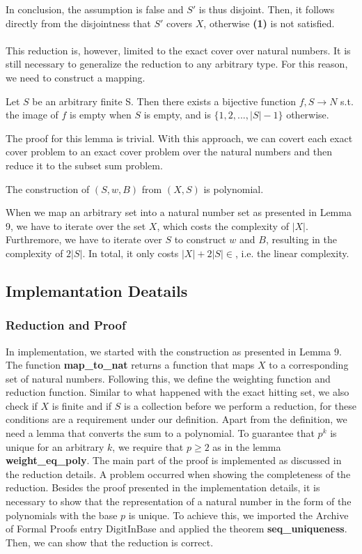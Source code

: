 In conclusion, the assumption is false and $S'$ is thus disjoint. Then, it follows directly from the disjointness that $S'$ covers $X$, otherwise \textbf{(1)}
is not satisfied. \\\\
This reduction is, however, limited to the exact cover over natural numbers. It is still necessary to generalize the reduction to any arbitrary type. For this reason,
we need to construct a mapping. 
\begin{lemma}
    Let $S$ be an arbitrary finite S. Then there exists a bijective function $f, S \rightarrow N$ s.t. the image of $f$ is empty when $S$ is empty, 
    and is $\{1, 2, ..., |S| - 1\}$ otherwise.
\end{lemma}
The proof for this lemma is trivial. With this approach, we can covert each exact cover problem to an exact cover problem over the natural numbers and then 
reduce it to the subset sum problem. 
\begin{lemma}
    The construction of $(S, w, B)$ from $(X, S)$ is polynomial. 
\end{lemma}
When we map an arbitrary set into a natural number set as presented in Lemma 9, we have to iterate over the set $X$, which costs the complexity of $|X|$. 
Furthremore, we have to iterate over $S$ to construct $w$ and $B$, resulting in the complexity of $2|S|$. In total, it only costs $|X| + 2|S| \in$, 
i.e. the linear complexity. 

\subsection{Implemantation Deatails}
\subsubsection{Reduction and Proof}
In implementation, we started with the construction as presented in Lemma 9. The function \textbf{map\_to\_nat} returns 
a function that maps $X$ to a corresponding set of natural numbers. Following this, we define the weighting function and 
reduction function. Similar to what happened with the exact hitting set, we also check if $X$ is finite and if $S$ is 
a collection before we perform a reduction, for these conditions are a requirement under our definition. 
Apart from the definition, we need a lemma that converts the sum to a polynomial. To guarantee that $p^k$ is unique for an arbitrary $k$, 
we require that $p \geq 2$ as in the lemma \textbf{weight\_eq\_poly}.
The main part of the proof is implemented as discussed in the reduction details. A problem occurred when showing the completeness of the reduction. 
Besides the proof presented in the implementation details, it is necessary to show that the representation of a natural number in the form 
of the polynomials with the base $p$ is unique. To achieve this, we imported the Archive of Formal Proofs entry DigitInBase and applied the theorem 
\textbf{seq\_uniqueness}.
Then, we can show that the reduction is correct.


